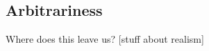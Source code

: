 \documentclass[11pt]{article}
\begin{document}
\begin{spacing}{1.5}
\section{Arbitrariness}
Where does this leave us? [stuff about realism]

\ifstandalone
\end{spacing}%
\fi
\end{document}
